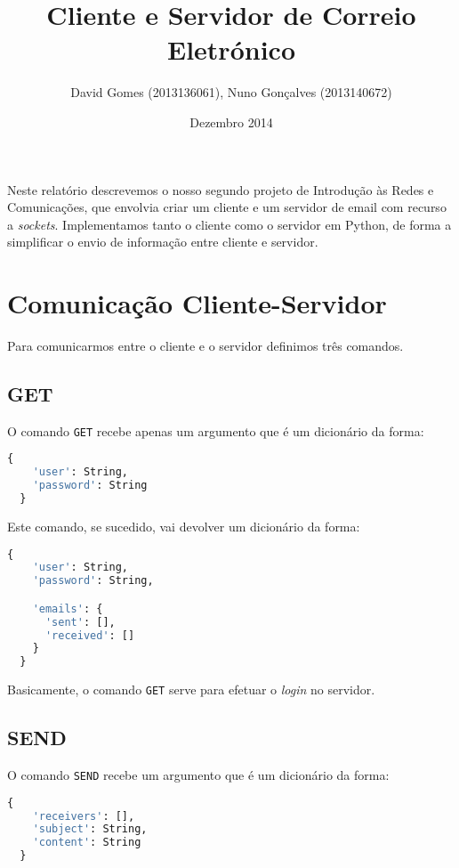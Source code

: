 \documentclass[12pt]{article}
\title{Cliente e Servidor de Correio Eletrónico}
\author{David Gomes (2013136061), Nuno Gonçalves (2013140672)}
\date{Dezembro 2014}
\begin{document}
\maketitle

Neste relatório descrevemos o nosso segundo projeto de Introdução às Redes
e Comunicações, que envolvia criar um cliente e um servidor de email com
recurso a \textit{sockets}. Implementamos tanto o cliente como o servidor
em Python, de forma a simplificar o envio de informação entre cliente e servidor.

\section{Comunicação Cliente-Servidor}
Para comunicarmos entre o cliente e o servidor definimos três comandos.

\subsection{GET}
O comando \texttt{GET} recebe apenas um argumento que é um dicionário da forma:

\vspace{2mm}
\begin{lstlisting}[language=Python]
  {
    'user': String,
    'password': String
  }
\end{lstlisting}

Este comando, se sucedido, vai devolver um dicionário da forma:

\vspace{2mm}
\begin{lstlisting}[language=Python]
  {
    'user': String,
    'password': String,

    'emails': {
      'sent': [],
      'received': []
    }
  }
\end{lstlisting}

Basicamente, o comando \texttt{GET} serve para efetuar o \textit{login} no
servidor.

\subsection{SEND}
O comando \texttt{SEND} recebe um argumento que é um dicionário da forma:

\vspace{2mm}
\begin{lstlisting}[language=Python]
  {
    'receivers': [],
    'subject': String,
    'content': String
  }
\end{lstlisting}
\end{document}

